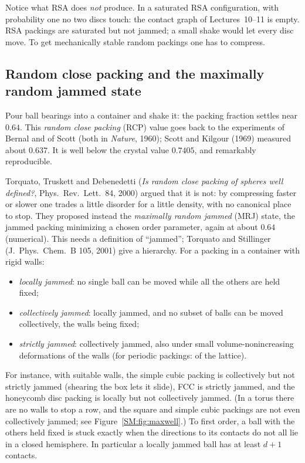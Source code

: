 Notice what RSA does \emph{not} produce. In a saturated RSA configuration, with probability one no two
discs touch: the contact graph of Lectures~10--11 is empty. RSA packings are saturated but not
jammed; a small shake would let every disc move. To get mechanically stable random packings one has to
compress.

\subsection{Random close packing and the maximally random jammed state}

Pour ball bearings into a container and shake it: the packing fraction settles near $0.64$. This
\emph{random close packing} (RCP) value goes back to the experiments of Bernal and of Scott (both in
\emph{Nature}, 1960); Scott and Kilgour (1969) measured about $0.637$. It is well below the crystal value
$0.7405$, and remarkably reproducible.

Torquato, Truskett and Debenedetti (\emph{Is random close packing of spheres well defined?}, Phys.\
Rev.\ Lett.\ 84, 2000) argued that it is not: by compressing faster or slower one trades a little
disorder for a little density, with no canonical place to stop. They proposed instead the
\emph{maximally random jammed} (MRJ) state, the jammed packing minimizing a chosen order parameter,
again at about $0.64$ (numerical). This needs a definition of ``jammed''; Torquato and Stillinger
(J.~Phys.\ Chem.~B 105, 2001) give a hierarchy. For a packing in a container with rigid walls:
\begin{itemize}[nosep]
\item \emph{locally jammed}: no single ball can be moved while all the others are held fixed;
\item \emph{collectively jammed}: locally jammed, and no subset of balls can be moved
  collectively, the walls being fixed;
\item \emph{strictly jammed}: collectively jammed, also under small volume-nonincreasing
  deformations of the walls (for periodic packings: of the lattice).
\end{itemize}
For instance, with suitable walls, the simple cubic packing is collectively but not strictly jammed (shearing the box lets it
slide), FCC is strictly jammed, and the honeycomb disc packing is locally but not collectively jammed.
(In a torus there are no walls to stop a row, and the square and simple cubic packings are not even
collectively jammed; see Figure~\ref{SM:fig:maxwell}.)
To first order, a ball with the others held fixed is stuck exactly when the directions to its contacts
do not all lie in a closed hemisphere. In particular a locally jammed ball has at least $d+1$ contacts.

